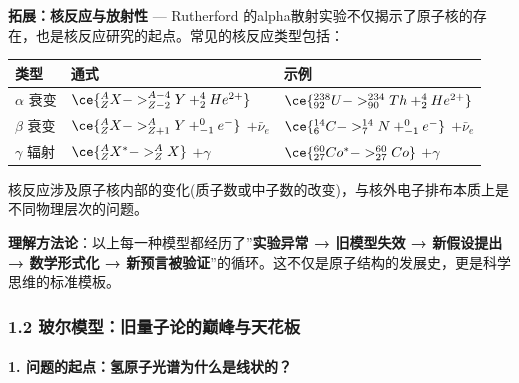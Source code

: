 \textbf{拓展：核反应与放射性} --- Rutherford 的alpha散射实验不仅揭示了原子核的存在，也是核反应研究的起点。常见的核反应类型包括：

{\def\LTcaptype{none} %
\begin{longtable}[]{@{}
  >{\raggedright\arraybackslash}p{}
  >{\raggedright\arraybackslash}p{}
  >{\raggedright\arraybackslash}p{}@{}}
\toprule\noalign{}
\begin{minipage}[b]{\linewidth}\raggedright
类型
\end{minipage} & \begin{minipage}[b]{\linewidth}\raggedright
通式
\end{minipage} & \begin{minipage}[b]{\linewidth}\raggedright
示例
\end{minipage} \\
\midrule\noalign{}
\endhead
\bottomrule\noalign{}
\endlastfoot
\(\alpha\) 衰变 & \(\ce{^{A}_{Z}X -> ^{A-4}_{Z-2}Y + ^{4}_{2}He^{2+}}\) & \(\ce{^{238}_{92}U -> ^{234}_{90}Th + ^{4}_{2}He^{2+}}\) \\
\(\beta\) 衰变 & \(\ce{^{A}_{Z}X -> ^{A}_{Z+1}Y + ^{0}_{-1}e^{-}}\) \(+ \bar{\nu}_e\) & \(\ce{^{14}_{6}C -> ^{14}_{7}N + ^{0}_{-1}e^{-}}\) \(+ \bar{\nu}_e\) \\
\(\gamma\) 辐射 & \(\ce{^{A}_{Z}X^{*} -> ^{A}_{Z}X}\) \(+ \gamma\) & \(\ce{^{60}_{27}Co^{*} -> ^{60}_{27}Co}\) \(+ \gamma\) \\
\end{longtable}
}

核反应涉及原子核内部的变化(质子数或中子数的改变)，与核外电子排布本质上是不同物理层次的问题。

\textbf{理解方法论}：以上每一种模型都经历了''\textbf{实验异常 → 旧模型失效 → 新假设提出 → 数学形式化 → 新预言被验证}''的循环。这不仅是原子结构的发展史，更是科学思维的标准模板。

\subsubsection{1.2 玻尔模型：旧量子论的巅峰与天花板}\label{ux73bbux5c14ux6a21ux578bux65e7ux91cfux5b50ux8bbaux7684ux5dc5ux5cf0ux4e0eux5929ux82b1ux677f}

\paragraph{1. 问题的起点：氢原子光谱为什么是线状的？}\label{ux95eeux9898ux7684ux8d77ux70b9ux6c22ux539fux5b50ux5149ux8c31ux4e3aux4ec0ux4e48ux662fux7ebfux72b6ux7684}

